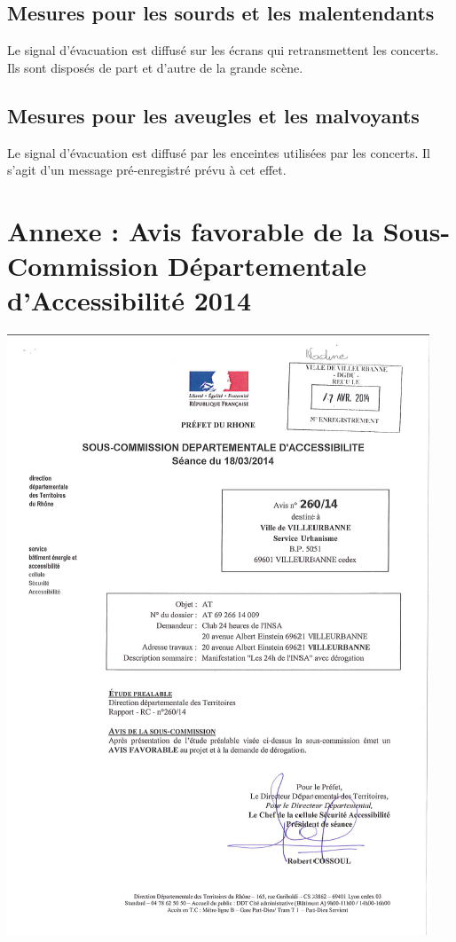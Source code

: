 \documentclass[hidelinks, paper=a4, fontsize=13pt]{report}
\begin{document}
\subsection{Mesures pour les sourds et les malentendants}

Le signal d’évacuation est diffusé sur les écrans qui retransmettent les concerts. Ils sont disposés de part et d’autre de la grande scène.

\subsection{Mesures pour les aveugles et les malvoyants}

Le signal d’évacuation est diffusé par les enceintes utilisées par les concerts. Il s’agit d’un message pré-enregistré prévu à cet effet.
\newpage

\section{Annexe : Avis favorable de la Sous-Commission Départementale d'Accessibilité 2014}

\begin{center}
\includegraphics[scale=0.85]{Annexes/Documents/SCDAcces}
\end{center}
\end{document}
